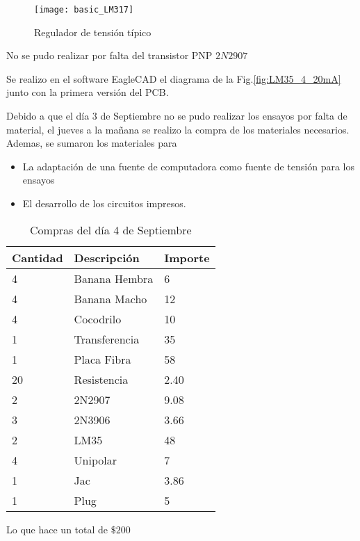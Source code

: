 \begin{figure}[H] %
  \begin{center}
  \texttt{[image: basic\_LM317]}
  \end{center}
  \caption{Regulador de tensión típico }
  \label{fig:basic_LM317}
\end{figure}


No se pudo realizar por falta del transistor PNP $2N2907$

Se realizo en el software EagleCAD el diagrama de la Fig.\ref{fig:LM35_4_20mA} junto con 
la primera versión del PCB.

Debido a que el día 3 de Septiembre no se pudo realizar los ensayos por falta de material,
el jueves a la mañana se realizo la compra de los materiales necesarios. Ademas, se sumaron
los materiales para 
\begin{itemize}
 \item La adaptación de una fuente de computadora como fuente de tensión para
los ensayos
\item El desarrollo de los circuitos impresos.
\end{itemize}
 
\begin{table}[H]
  \begin{tabular}{l l l}
    \toprule
    \textbf{Cantidad} & \textbf{Descripción} & \textbf{Importe} \\
    \toprule
    4 	& 	Banana Hembra 	& 	6\\
    4  & 	Banana Macho	& 	12\\
    4	&	Cocodrilo	&	10\\
    1	&	Transferencia	&	35\\
    1	&	Placa Fibra	&	58\\
    20	&	Resistencia	&	2.40\\
    2	&	2N2907		&	9.08\\
    3	&	2N3906		&	3.66\\
    2	&	LM35		&	48\\
    4	&	Unipolar	&	7\\
    1	&	Jac		&	3.86\\
    1	&	Plug		&	5\\
    \bottomrule
  \end{tabular}
  \caption{Compras del día 4 de Septiembre}
  \label{tab:compra2}
\end{table}
Lo que hace un total de $\$200$

